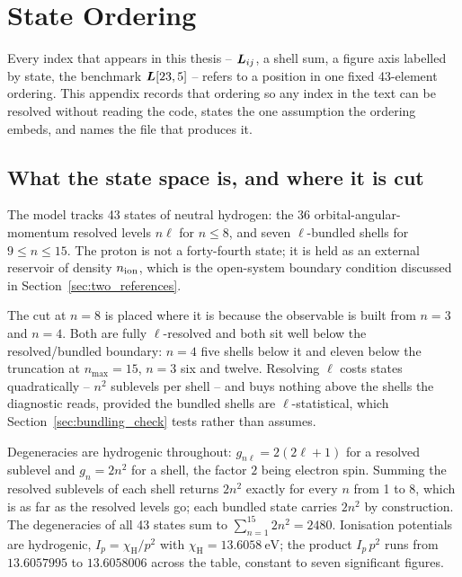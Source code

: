 \chapter{State Ordering}
\label{app:states}

Every index that appears in this thesis -- $\bm{L}_{ij}$, a shell sum, a figure
axis labelled by state, the benchmark $\bm{L}[23,5]$ -- refers to a position in
one fixed 43-element ordering. This appendix records that ordering so any index
in the text can be resolved without reading the code, states the one assumption
the ordering embeds, and names the file that produces it.

\section{What the state space is, and where it is cut}

The model tracks 43 states of neutral hydrogen: the 36 orbital-angular-momentum
resolved levels $n\ell$ for $n \le 8$, and seven $\ell$-bundled shells for
$9 \le n \le 15$. The proton is not a forty-fourth state; it is held as an
external reservoir of density $n_{\mathrm{ion}}$, which is the open-system boundary
condition discussed in Section~\ref{sec:two_references}.

The cut at $n=8$ is placed where it is because the observable is built from
$n=3$ and $n=4$. Both are fully $\ell$-resolved and both sit well below the
resolved/bundled boundary: $n=4$ five shells below it and eleven below the
truncation at $n_{\max}=15$, $n=3$ six and twelve.
Resolving $\ell$ costs states quadratically -- $n^2$ sublevels per shell -- and
buys nothing above the shells the diagnostic reads, provided the bundled shells
are $\ell$-statistical, which Section~\ref{sec:bundling_check} tests rather than
assumes.

Degeneracies are hydrogenic throughout: $g_{n\ell} = 2(2\ell+1)$ for a resolved
sublevel and $g_n = 2n^2$ for a shell, the factor $2$ being electron spin.
Summing the resolved sublevels of each shell returns $2n^2$ exactly for every
$n$ from 1 to 8, which is as far as the resolved levels go; each bundled state
carries $2n^2$ by construction. The degeneracies of all 43 states sum to
$\sum_{n=1}^{15} 2n^2 = 2480$. Ionisation potentials are hydrogenic,
$I_p = \chi_{\mathrm{H}}/p^2$ with $\chi_{\mathrm{H}} = \SI{13.6058}{\electronvolt}$;
the product $I_p\,p^2$ runs from $13.6057995$ to $13.6058006$ across the table,
constant to seven significant figures.

